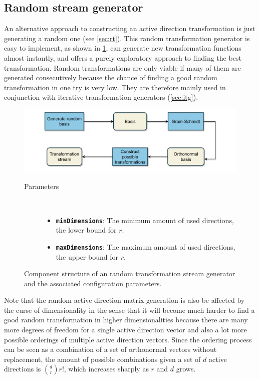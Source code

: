 \documentclass[
  a4paper,  %
  twoside,  %
  bibliography=totoc,
  headsepline,
  cleardoublepage=empty,
  parskip=half,
  draft=false
]{scrbook}
\begin{document}
\subsection {Random stream generator}
\label{sec:rtg}

An alternative approach to constructing an active direction transformation is just generating a random one (see \cref{sec:rt}).
This random transformation generator is easy to implement, as shown in \cref{fig:rtsg}, can generate new transformation functions almost instantly, and offers a purely exploratory approach to finding the best transformation.
Random transformations are only viable if many of them are generated consecutively because the chance of finding a good random transformation in one try is very low.
They are therefore mainly used in conjunction with iterative transformation generators (\cref{sec:itg}).

\begin{mdframed}[style=style,frametitle={Transformation stream generator (random)}]
\begin{figure}[H]
\includegraphics[width=\textwidth]{graphics/TransformationStreamGen_Random.pdf}
\delimit
\begin{description}
\item[Parameters] {~ \begin{itemize}[\indent{}]
\item \texttt{\textbf{minDimensions}}: The minimum amount of used directions, \ie the lower bound for $r$.
\item \texttt{\textbf{maxDimensions}}: The maximum amount of used directions, \ie the upper bound for $r$.
\end{itemize}}
\end{description}
\delimit
\caption{Component structure of an random transformation stream generator and the associated configuration parameters.}
\label{fig:rtsg}
\end{figure}
\end{mdframed}
%
Note that the random active direction matrix generation is also be affected by the curse of dimensionality in the sense that it will become much harder to find a good random transformation in higher dimensionalities because there are many more degrees of freedom for a single active direction vector and also a lot more possible orderings of multiple active direction vectors.
Since the ordering process can be seen as a combination of a set of orthonormal vectors without replacement, the amount of possible combinations given a set of $d$ active directions is $\binom{d}{r} r!$, which increases sharply as $r$ and $d$ grows.
\end{document}
